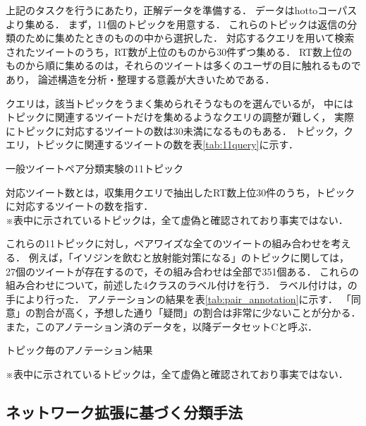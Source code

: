 \documentclass[japanese]{jnlp_1.4}
\newcommand{\addspan}[1]{}
\begin{document}
上記のタスクを行うにあたり，正解データを準備する．
データはhottoコーパスより集める．
まず，11個のトピックを用意する．
これらのトピックは返信の分類のために集めたときのもの\addspan{（表
\ref{tab:20query}）}の中から選択した．
対応するクエリを用いて検索されたツイートのうち，RT数が上位のものから30件ずつ集める．
RT数上位のものから順に集めるのは，それらのツイートは多くのユーザの目に触れるものであり，
論述構造を分析・整理する意義が大きいためである．
\addspan{ただし，疑問を呈するツイートのRT数が上位に来ることは少ないため，
この集め方では疑問の関係は少ないデータとなる．}
クエリは，該当トピックをうまく集められそうなものを選んでいるが，
中にはトピックに関連するツイートだけを集めるようなクエリの調整が難しく，
実際にトピックに対応するツイートの数は30未満になるものもある．
トピック，クエリ，トピックに関連するツイートの数を表\ref{tab:11query}に示す．

\begin{table}[b]
\caption{一般ツイートペア分類実験の11トピック}
\label{tab:11query}

\vspace{0.5zw}
\small 対応ツイート数とは，収集用クエリで抽出したRT数上位30件のうち，トピックに対応するツイートの数を指す．\\
※表中に示されているトピックは，全て虚偽と確認されており事実ではない．\par
\end{table}

これらの11トピックに対し，ペアワイズな全てのツイートの組み合わせを考える．
例えば，「イソジンを飲むと放射能対策になる」のトピックに関しては，
27個のツイートが存在するので，その組み合わせは全部で351個ある．
これらの組み合わせについて，前述した4クラスのラベル付けを行う．
ラベル付けは，\addspan{アノテーション経験の豊富な一人のアノテーター}の手により行った．
アノテーションの結果を表\ref{tab:pair_annotation}に示す．
「同意」の割合が高く，予想した通り「疑問」の割合は非常に少ないことが分かる．
また，このアノテーション済のデータを，以降データセットCと呼ぶ．

\begin{table}[t]
\caption{トピック毎のアノテーション結果}
\label{tab:pair_annotation}

\vspace{0.5zw}\small
※表中に示されているトピックは，全て虚偽と確認されており事実ではない．\par
\end{table}


\subsection{ネットワーク拡張に基づく分類手法}
\end{document}
